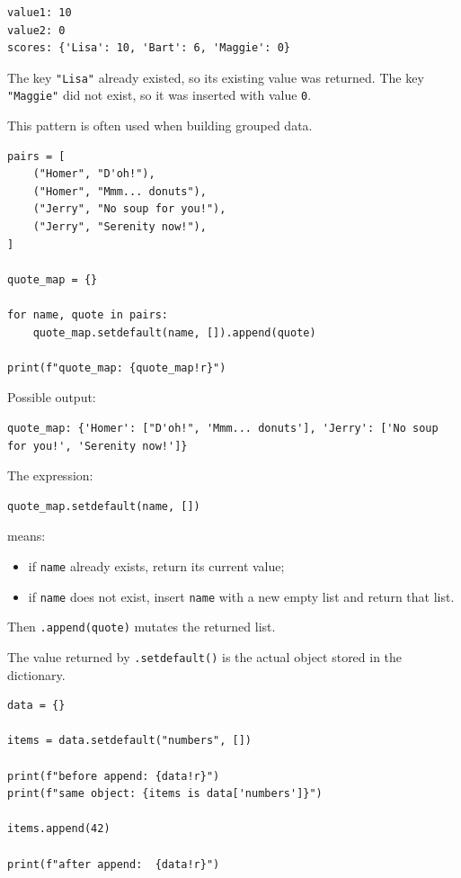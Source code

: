 \begin{verbatim}
value1: 10
value2: 0
scores: {'Lisa': 10, 'Bart': 6, 'Maggie': 0}
\end{verbatim}

The key \texttt{"Lisa"} already existed, so its existing value was returned. The key \texttt{"Maggie"} did not exist, so it was inserted with value \texttt{0}.

This pattern is often used when building grouped data.

\begin{verbatim}
pairs = [
    ("Homer", "D'oh!"),
    ("Homer", "Mmm... donuts"),
    ("Jerry", "No soup for you!"),
    ("Jerry", "Serenity now!"),
]

quote_map = {}

for name, quote in pairs:
    quote_map.setdefault(name, []).append(quote)

print(f"quote_map: {quote_map!r}")
\end{verbatim}

Possible output:

\begin{verbatim}
quote_map: {'Homer': ["D'oh!", 'Mmm... donuts'], 'Jerry': ['No soup for you!', 'Serenity now!']}
\end{verbatim}

The expression:

\begin{verbatim}
quote_map.setdefault(name, [])
\end{verbatim}

means:

\begin{itemize}
    \item if \texttt{name} already exists, return its current value;
    \item if \texttt{name} does not exist, insert \texttt{name} with a new empty list and return that list.
\end{itemize}

Then \texttt{.append(quote)} mutates the returned list.

The value returned by \texttt{.setdefault()} is the actual object stored in the dictionary.

\begin{verbatim}
data = {}

items = data.setdefault("numbers", [])

print(f"before append: {data!r}")
print(f"same object: {items is data['numbers']}")

items.append(42)

print(f"after append:  {data!r}")
\end{verbatim}

